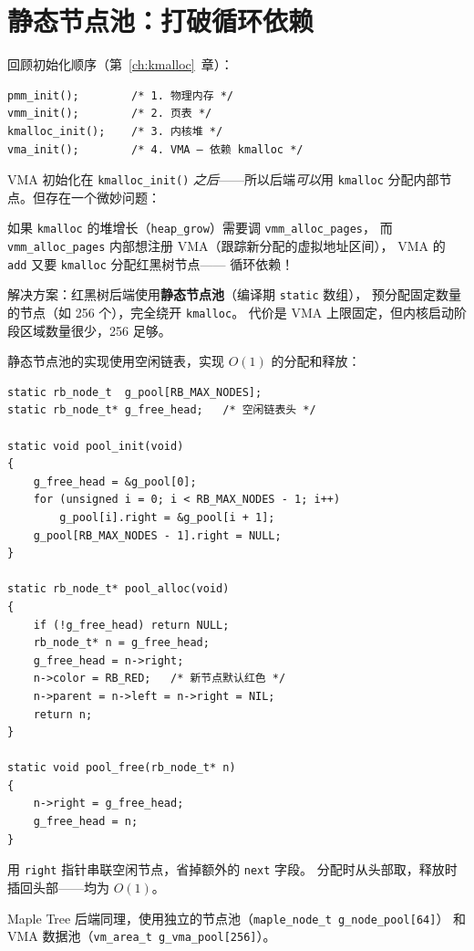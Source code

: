 \section{静态节点池：打破循环依赖}
\label{sec:vma-pool}

回顾初始化顺序（第~\ref{ch:kmalloc}~章）：

\begin{lstlisting}[style=cstyle]
pmm_init();        /* 1. 物理内存 */
vmm_init();        /* 2. 页表 */
kmalloc_init();    /* 3. 内核堆 */
vma_init();        /* 4. VMA — 依赖 kmalloc */
\end{lstlisting}

VMA 初始化在 \texttt{kmalloc\_init()} \emph{之后}——所以后端\emph{可以}用 \texttt{kmalloc}
分配内部节点。但存在一个微妙问题：

\begin{whybox}
如果 \texttt{kmalloc} 的堆增长（\texttt{heap\_grow}）需要调 \texttt{vmm\_alloc\_pages}，
而 \texttt{vmm\_alloc\_pages} 内部想注册 VMA（跟踪新分配的虚拟地址区间），
VMA 的 \texttt{add} 又要 \texttt{kmalloc} 分配红黑树节点——
循环依赖！

解决方案：红黑树后端使用\textbf{静态节点池}（编译期 \texttt{static} 数组），
预分配固定数量的节点（如 256 个），完全绕开 \texttt{kmalloc}。
代价是 VMA 上限固定，但内核启动阶段区域数量很少，256 足够。
\end{whybox}

静态节点池的实现使用空闲链表，实现 $O(1)$ 的分配和释放：

\begin{lstlisting}[style=cstyle]
static rb_node_t  g_pool[RB_MAX_NODES];
static rb_node_t* g_free_head;   /* 空闲链表头 */

static void pool_init(void)
{
    g_free_head = &g_pool[0];
    for (unsigned i = 0; i < RB_MAX_NODES - 1; i++)
        g_pool[i].right = &g_pool[i + 1];
    g_pool[RB_MAX_NODES - 1].right = NULL;
}

static rb_node_t* pool_alloc(void)
{
    if (!g_free_head) return NULL;
    rb_node_t* n = g_free_head;
    g_free_head = n->right;
    n->color = RB_RED;   /* 新节点默认红色 */
    n->parent = n->left = n->right = NIL;
    return n;
}

static void pool_free(rb_node_t* n)
{
    n->right = g_free_head;
    g_free_head = n;
}
\end{lstlisting}

用 \texttt{right} 指针串联空闲节点，省掉额外的 \texttt{next} 字段。
分配时从头部取，释放时插回头部——均为 $O(1)$。

Maple Tree 后端同理，使用独立的节点池（\texttt{maple\_node\_t g\_node\_pool[64]}）
和 VMA 数据池（\texttt{vm\_area\_t g\_vma\_pool[256]}）。


